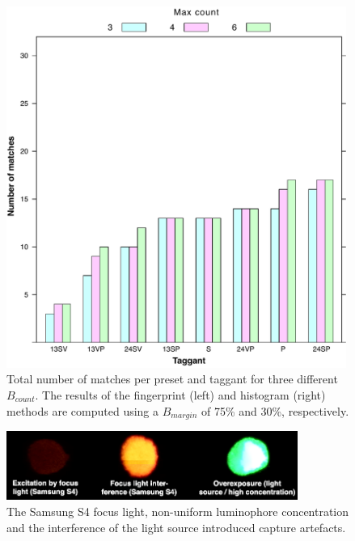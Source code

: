 \documentclass[thesis.tex]{subfiles}
\begin{document}
\begin{figure}[t]
\centering \includegraphics[page=7,width=0.99\textwidth,height=\textheight,keepaspectratio=true]{images/experiment/tags_configs}
\vspace{-3mm}
\caption{Total number of matches per preset and taggant for three different $B_{count}$. The results of the fingerprint (left) and histogram (right) methods are computed using a $B_{margin}$ of 75\% and 30\%, respectively.}
\label{figure:tags_presets}
\end{figure}

\begin{figure}[b]
\centering \includegraphics[page=2,width=0.85\textwidth,height=\textheight,keepaspectratio=true]{images/experiment/artefacts}
\vspace{-3mm}
\caption{The Samsung S4 focus light, non-uniform luminophore concentration and the interference of the light source introduced capture artefacts.}
\label{figure:artefacts}
\end{figure}
\end{document}

